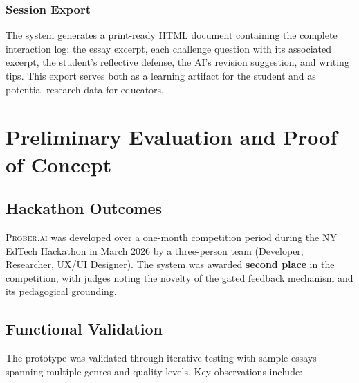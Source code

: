 \documentclass[11pt,a4paper]{article}
\begin{document}
\subsubsection{Session Export}

The system generates a print-ready HTML document containing the complete interaction log: the essay excerpt, each challenge question with its associated excerpt, the student's reflective defense, the AI's revision suggestion, and writing tips. This export serves both as a learning artifact for the student and as potential research data for educators.

\section{Preliminary Evaluation and Proof of Concept}
\label{sec:evaluation}

\subsection{Hackathon Outcomes}

\textsc{Prober.ai} was developed over a one-month competition period during the NY EdTech Hackathon in March 2026 by a three-person team (Developer, Researcher, UX/UI Designer). The system was awarded \textbf{second place} in the competition, with judges noting the novelty of the gated feedback mechanism and its pedagogical grounding.

\subsection{Functional Validation}

The prototype was validated through iterative testing with sample essays spanning multiple genres and quality levels. Key observations include:
\end{document}
